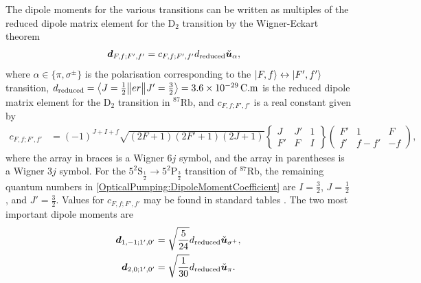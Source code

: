 The dipole moments for the various transitions can be written as multiples of the reduced dipole matrix element for the $\text{D}_2$ transition by the Wigner-Eckart theorem \citep{Eckart:1930,Brink:1962}
\begin{align}
    \bm{d}_{F,f;F',f'} &= c_{F,f;F',f'} d_\text{reduced} \check{\bm{u}}_\alpha,
\end{align}
where $\alpha\in \{\pi,\sigma^\pm\}$ is the polarisation corresponding to the ${\left|F, f\right>} \leftrightarrow {\ensuremath{\left|F', f'\right>}}$ transition, $d_\text{reduced} = \left<J=\frac{1}{2} \middle\| e r \middle\| J'=\frac{3}{2}\right> = 3.6 \times \unit[10^{-29}]{C.m}$ is the reduced dipole matrix element for the $\text{D}_2$ transition in $^{87}\text{Rb}$, and $c_{F, f; F', f'}$ is a real constant given by \citep{Steck:2009}
\begin{align}
    \label{OpticalPumping:DipoleMomentCoefficient}
    c_{F,f;F',f'} &= (-1)^{J +I + f} \sqrt{(2 F + 1)(2F' + 1)(2J + 1)}
    \begin{Bmatrix} 
        J & J' & 1 \\
        F' & F & I 
    \end{Bmatrix}
    \begin{pmatrix}
        F' & 1 & F\\
        f' & f - f' & -f
    \end{pmatrix},
\end{align}
where the array in braces is a Wigner $6j$ symbol, and the array in parentheses is a Wigner $3j$ symbol.  For the $5^2\text{S}_{\frac{1}{2}} \rightarrow 5^2\text{P}_{\frac{3}{2}}$ transition of $^{87}\text{Rb}$, the remaining quantum numbers in \eqref{OpticalPumping:DipoleMomentCoefficient} are $I = \frac{3}{2}$, $J = \frac{1}{2}$, and $J' = \frac{3}{2}$.  Values for $c_{F, f; F', f'}$ may be found in standard tables \citep{Steck:2009}.  The two most important dipole moments are
\begin{align}
    \bm{d}_{1, -1; 1', 0'} &=  \sqrt{\frac{5}{24}} d_\text{reduced} \check{\bm{u}}_{\sigma^+},\\
    \bm{d}_{2, 0; 1', 0'} &= \sqrt{\frac{1}{30}} d_\text{reduced} \check{\bm{u}}_\pi.
\end{align}

